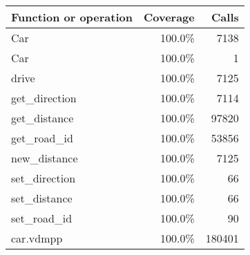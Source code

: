 \documentclass[a4paper]{article}
\begin{document}
\begin{longtable}{|l|r|r|}
\hline
Function or operation & Coverage & Calls \\
\hline
\hline
Car & 100.0\% & 7138 \\
\hline
Car & 100.0\% & 1 \\
\hline
drive & 100.0\% & 7125 \\
\hline
get\_direction & 100.0\% & 7114 \\
\hline
get\_distance & 100.0\% & 97820 \\
\hline
get\_road\_id & 100.0\% & 53856 \\
\hline
new\_distance & 100.0\% & 7125 \\
\hline
set\_direction & 100.0\% & 66 \\
\hline
set\_distance & 100.0\% & 66 \\
\hline
set\_road\_id & 100.0\% & 90 \\
\hline
\hline
car.vdmpp & 100.0\% & 180401 \\
\hline
\end{longtable}
\end{document}
